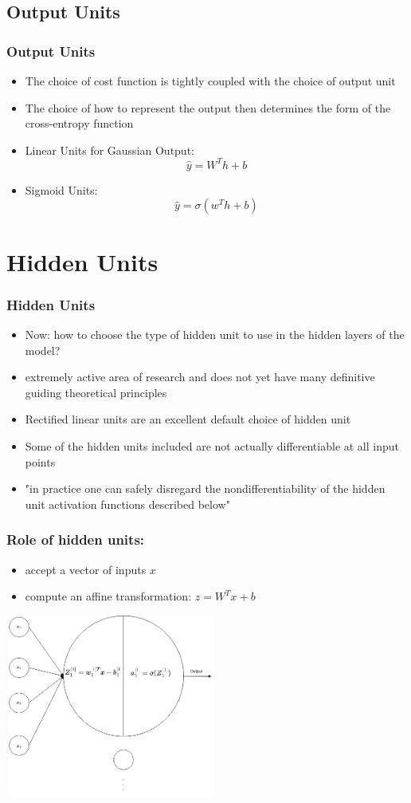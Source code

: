 \documentclass{beamer}
\begin{document}
\subsection{Output Units}
\begin{frame}
	\frametitle{Output Units}
	\begin{itemize}
		\item The choice of cost function is tightly coupled with the choice of output unit
		\item The choice of how to represent the output then determines the form of the cross-entropy function
		\item Linear Units for Gaussian Output: 
			$$ \hat{y}= W^Th + b $$
		\item Sigmoid Units: 
			$$\hat{y}=\sigma (w^Th+b) $$
		
	\end{itemize}
\end{frame}

\section{Hidden Units}
\begin{frame}
	\frametitle{Hidden Units}
	\begin{itemize}
		\item Now: how to choose the type of hidden unit to use in the hidden layers of the model?
			\pause
		\item  extremely active area of research and does not
yet have many deﬁnitive guiding theoretical principles
\pause
\item Rectiﬁed linear units are an excellent default choice of hidden unit
	\pause
\item Some of the hidden units included are not actually diﬀerentiable at all input points
\item "in practice one can safely disregard the nondiﬀerentiability of the hidden unit activation functions described below" 
	\end{itemize}
\end{frame}
\begin{frame}
	\frametitle{Role of hidden units: }
	\begin{itemize}
		\item accept a vector of inputs $x$
		\item compute an affine transformation: $z = W^Tx + b$
	\end{itemize}
	\center
	\includegraphics[width = 70mm, height= 60mm]{single_neuron.png}
	
\end{frame}
\end{document}
